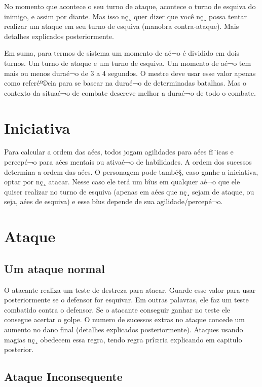 	No momento que acontece o seu turno de ataque, acontece o turno de esquiva do inimigo, e assim por diante. Mas isso nç¸ quer dizer que você nç¸ possa tentar realizar um ataque em seu turno de esquiva (manobra contra-ataque). Mais detalhes explicados posteriormente.
	
	Em suma, para termos de sistema um momento de aé¬o é dividido em dois turnos. Um turno de ataque e um turno de esquiva. Um momento de aé¬o tem mais ou menos duraé¬o de 3 a 4 segundos.  O mestre deve usar esse valor apenas como referéº©cia para se basear na duraé¬o de determinadas batalhas. Mas o contexto da situaé¬o de combate descreve melhor a duraé¬o de todo o combate. 

\section{Iniciativa}

Para calcular a ordem das aées, todos jogam agilidades para aées fï¨icas e percepé¬o para aées mentais ou ativaé¬o de habilidades. A ordem dos sucessos determina a ordem das aées. 
O personagem pode també§, caso ganhe a iniciativa, optar por nç¸ atacar. Nesse caso ele terá um bîus em qualquer aé¬o que ele quiser realizar no turno de esquiva (apenas em aées que nç¸ sejam de ataque, ou seja, aées de esquiva) e esse bîus depende de sua agilidade/percepé¬o. 

\section{Ataque}

\subsection{Um ataque normal}

O atacante realiza um teste de destreza para atacar. Guarde esse valor para usar posteriormente se o defensor for esquivar. Em outras palavras, ele faz um teste combatido contra o defensor. Se o atacante conseguir ganhar no teste ele consegue acertar o golpe. O numero de sucessos extras no ataque concede um aumento no dano final (detalhes explicados posteriormente).
Ataques usando magias nç¸ obedecem essa regra, tendo regra prî¤ria explicando em capitulo posterior.

\subsection{Ataque Inconsequente}

